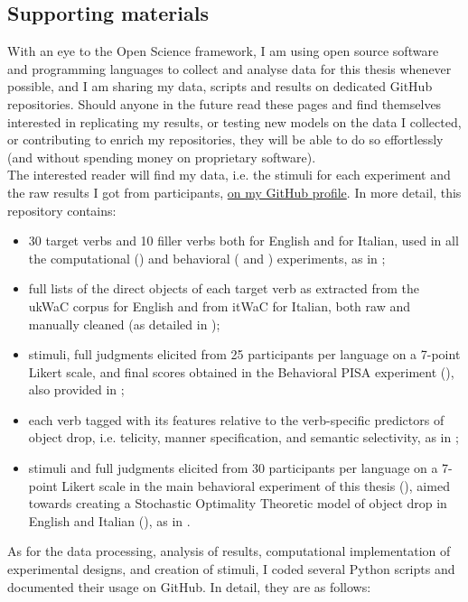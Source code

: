\subsection{Supporting materials}
With an eye to the Open Science framework, I am using open source software and programming languages to collect and analyse data for this thesis whenever possible, and I am sharing my data, scripts and results on dedicated GitHub repositories. Should anyone in the future read these pages and find themselves interested in replicating my results, or testing new models on the data I collected, or contributing to enrich my repositories, they will be able to do so effortlessly (and without spending money on proprietary software).\\
The interested reader will find my data, i.e. the stimuli for each experiment and the raw results I got from participants, \href{https://github.com/giuliacappelli/dissertationData}{on my GitHub profile}. In more detail, this repository contains:
\begin{itemize}
    \item 30 target verbs and 10 filler verbs both for English and for Italian, used in all the computational () and behavioral ( and ) experiments, as in ;
    \item full lists of the direct objects of each target verb as extracted from the ukWaC corpus for English and from itWaC for Italian, both raw and manually cleaned (as detailed in );
    \item stimuli, full judgments elicited from 25 participants per language on a 7-point Likert scale, and final scores obtained in the Behavioral PISA experiment (), also provided in ;
    \item each verb tagged with its features relative to the verb-specific predictors of object drop, i.e. telicity, manner specification, and semantic selectivity, as in ;
    \item stimuli and full judgments elicited from 30 participants per language on a 7-point Likert scale in the main behavioral experiment of this thesis (), aimed towards creating a Stochastic Optimality Theoretic model of object drop in English and Italian (), as in .
\end{itemize}
As for the data processing, analysis of results, computational implementation of experimental designs, and creation of stimuli, I coded several Python scripts and documented their usage on GitHub. In detail, they are as follows:
